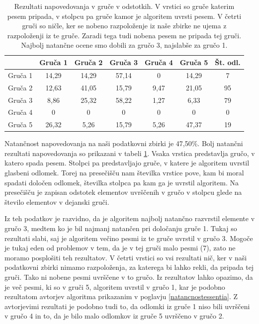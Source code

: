 \documentclass[a4paper, 12pt]{book}
\begin{document}
{\begin{table}[htb]
\begin{center}
\caption{Rezultati napovedovanja v gruče v odstotkih. V vrstici so gruče katerim pesem pripada, v stolpcu pa gruče kamor je algoritem uvrsti pesem. V četrti gruči so ničle, ker se nobeno razpoloženje iz naše zbirke ne ujema z razpoloženji iz te gruče. Zaradi tega tudi nobena pesem ne pripada tej gruči. Najbolj natančne ocene smo dobili za gručo 3, najslabše za gručo 1.}
\begin{tabular}{|l|c|c|c|c|c|c|}
\hline
 & Gruča 1 & Gruča 2 & Gruča 3 & Gruča 4 & Gruča 5 & Št. odl.\\ \hline
Gruča 1 & 14,29 & 14,29	& 57,14 & 0 & 14,29 & 7\\ \hline
Gruča 2 & 12,63 & 41,05 & 15,79 & 9,47 & 21,05 & 95\\ \hline
Gruča 3 & 8,86 & 25,32 & 58,22 & 1,27 & 6,33 & 79\\ \hline
Gruča 4 & 0	& 0 & 0 & 0 & 0 & 0\\ \hline
Gruča 5 & 26,32	& 5,26	& 15,79 & 5,26 & 47,37 & 19 \\ \hline

\hline
\end{tabular}
\label{natancnost_gruce_nasa}
\end{center}
\end{table}

Natančnost napovedovanja na naši podatkovni zbirki je 47,50\%. Bolj natančni rezultati napovedovanja so prikazani v tabeli \ref{natancnost_gruce_nasa}. Vsaka vrstica predstavlja gručo, v katero spada pesem. Stolpci pa predstavljajo gruče, v katere je algoritem uvrstil glasbeni odlomek. Torej na presečišču nam številka vrstice pove, kam bi moral spadati določen odlomek, številka stolpca pa kam ga je uvrstil algoritem. Na presečišču je zapisan odstotek elementov uvrščenih v gručo v stolpcu glede na število elementov v dejanski gruči. 

Iz teh podatkov je razvidno, da je algoritem najbolj natančno razvrstil elemente v gručo 3, medtem ko je bil najmanj natančen pri določanju gruče 1. Tukaj so rezultati slabi, saj je algoritem večino pesmi iz te gruče uvrstil v gručo 3. Mogoče je tukaj eden od problemov v tem, da je v tej gruči malo pesmi (7), zato ne moramo posplošiti teh rezultatov. V četrti vrstici so vsi rezultati nič, ker v naši podatkovni zbirki nimamo razpoloženja, za katerega bi lahko rekli, da pripada tej gruči. Tako ni nobene pesmi uvrščene v to gručo. Iz rezultatov lahko opazimo, da je več pesmi, ki so v gruči 5, algoritem uvrstil v gručo 1, kar je podobno rezultatom avtorjev algoritma prikazanim v poglavju \ref{natancnostessentia}. Z avtorjevimi rezultati je podobno tudi to, da odlomki iz gruče 1 niso bili uvrščeni v gručo 4 in to, da je bilo malo odlomkov iz gruče 5 uvrščeno v gručo 2.

}
\end{document}
